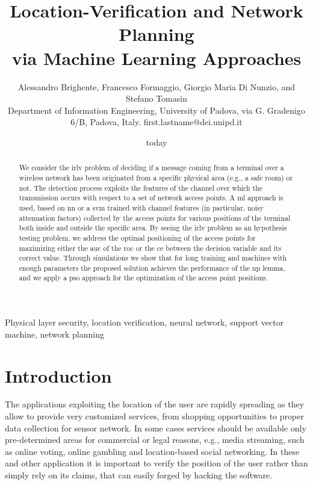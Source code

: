 \documentclass[twocolumns]{IEEEtran}
\title{Location-Verification and Network Planning \\ via Machine Learning Approaches}
\author{Alessandro Brighente, Francesco Formaggio, Giorgio Maria Di Nunzio, and  Stefano Tomasin  \\ {\small Department of Information Engineering, University of Padova, via G. Gradenigo 6/B, Padova, Italy. first.lastname@dei.unipd.it} }
\date{today}
\begin{document}
\maketitle

\begin{abstract}
We consider the \ac{irlv} problem of deciding if a message coming from a terminal over a wireless network has been originated from a specific physical area (e.g., a safe room) or not. The detection process exploits the features of the channel over which the transmission occurs with respect to a set of network access points. A  \ac{ml} approach is used, based on  \ac{nn} or a \ac{svm} trained with channel features  (in particular, noisy attenuation factors) collected by the access points for various positions of the terminal both inside and outside the specific area. By seeing the \ac{irlv} problem as an hypothesis testing problem, we address the optimal positioning of the access points for maximizing either the \ac{auc} of the \ac{roc} or  the \ac{ce} between the decision variable and its correct value. Through simulations we show that for long training and machines with enough parameters the proposed solution achieves the performance of the \ac{np} lemma, and we apply a \ac{pso} approach for the optimization of the access point positions.
\end{abstract}

\begin{IEEEkeywords}
Physical layer security, location verification, neural network, support vector machine, network planning
\end{IEEEkeywords}
\glsresetall

\section{Introduction}

The applications exploiting the location of the user are rapidly spreading as they allow to provide very customized services, from shopping opportunities to proper data collection for sensor network. In some cases services should be available only pre-determined areas for commercial or legal reasons, e.g., media streaming, such as online voting, online gambling and location-based social networking. In these and other application it is important to verify the position of the user rather than simply rely on its claims, that can easily forged by hacking the software.
\end{document}
